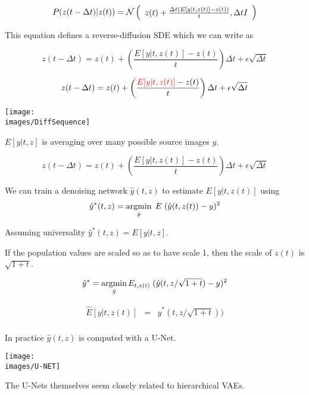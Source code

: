 {

$$P(z(t - \Delta t)|z(t)) = {\cal N}\left(\begin{array}{l} z(t) + \frac{\Delta t(E[y|t,z(t)] - z(t))}{t}, \Delta t I\end{array}\right)$$

\vfill
This equation defines a reverse-diffusion SDE which we can write as

{\huge
$$z(t - \Delta t) = z(t) + \left(\frac{E[y|t,z(t)] - z(t)}{t}\right)\Delta t +  \epsilon\sqrt{\Delta t}$$
}


{\huge
$$z(t - \Delta t) = z(t) + \left(\frac{{\color{red} E[y|t,z(t)]} - z(t)}{t}\right)\Delta t +  \epsilon\sqrt{\Delta t}$$
}

\vfill
\centerline{\texttt{[image: \\images/DiffSequence]}}

\vfill
$E[y|t,z]$ is averaging over many possible source images $y$.


$$z(t - \Delta t) = z(t) + \left(\frac{E[y|t,z(t)] - z(t)}{t}\right)\Delta t +  \epsilon\sqrt{\Delta t}$$

\vfill
We can train a denoising network $\hat{y}(t,z)$ to estimate $E[y|t,z(t)]$ using
$$\hat{y}^*(t,z) = \operatorname*{argmin}_{\hat{y}} \;E \;(\hat{y}(t,z(t)) - y)^2$$


\vfill
Assuming universality $\hat{y}^*(t,z) = E[y|t,z]$.


\vfill
If the population values are scaled so as to have scale 1, then the scale of $z(t)$ is $\sqrt{1+t}$.

\vfill
$$\hat{y}^* = \operatorname*{argmin}_{\hat{y}} E_{t,z(t)} \; (\hat{y}(t,z/\sqrt{1+t}) - y)^2$$

\vfill
\begin{eqnarray*}
\hat{E}[y|t,z(t)] & = & \hat{y}^*(t,z/\sqrt{1+t})) \\
\end{eqnarray*}


\vfill
In practice $\hat{y}(t,z)$ is computed with a U-Net.

\vfill
\centerline{\texttt{[image: \\images/U-NET]}}

\vfill
The U-Nets themselves seem closely related to hierarchical VAEs.


}
